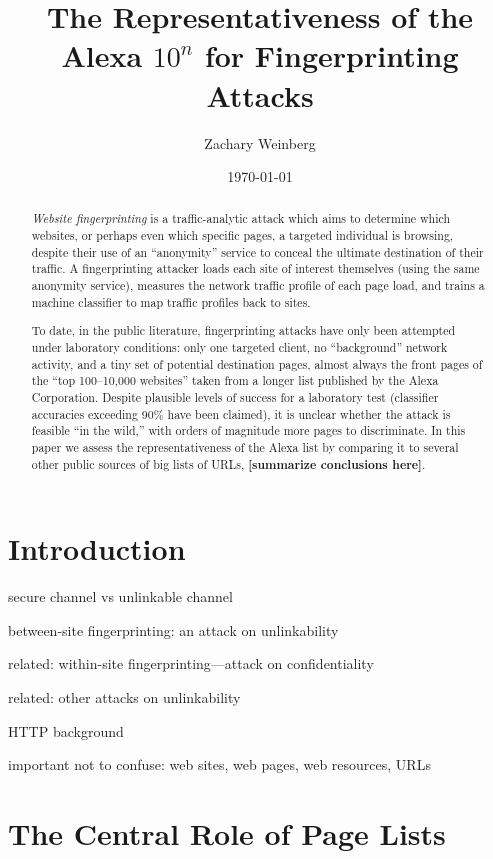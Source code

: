\documentclass{zarticle}
\def\todo#1{{\color{todocolor}\bfseries [#1]}}
\begin{document}
\title{The Representativeness of the Alexa $10^n$ for Fingerprinting Attacks}
\author{Zachary Weinberg}
\date{\today}
\maketitle

\begin{abstract}
\textit{Website fingerprinting} is a traffic-analytic attack which
aims to determine which websites, or perhaps even which specific
pages, a targeted individual is browsing, despite their use of an
“anonymity” service to conceal the ultimate destination of their
traffic.  A fingerprinting attacker loads each site of interest
themselves (using the same anonymity service), measures the network
traffic profile of each page load, and trains a machine classifier to
map traffic profiles back to sites.

To date, in the public literature, fingerprinting attacks have only
been attempted under laboratory conditions: only one targeted client,
no “background” network activity, and a tiny set of potential
destination pages, almost always the front pages of the “top
100--10,000 websites” taken from a longer list published by the Alexa
Corporation.  Despite plausible levels of success for a laboratory
test (classifier accuracies exceeding 90\% have been claimed), it is
unclear whether the attack is feasible “in the wild,” with orders of
magnitude more pages to discriminate. In this paper we assess the
representativeness of the Alexa list by comparing it to several other
public sources of big lists of URLs, \todo{summarize conclusions
  here}.
\end{abstract}

\section{Introduction}

secure channel vs unlinkable channel

between-site fingerprinting: an attack on unlinkability

related: within-site fingerprinting---attack on confidentiality

related: other attacks on unlinkability

HTTP background

important not to confuse: web sites, web pages, web resources, URLs

\section{The Central Role of Page Lists}
\end{document}

